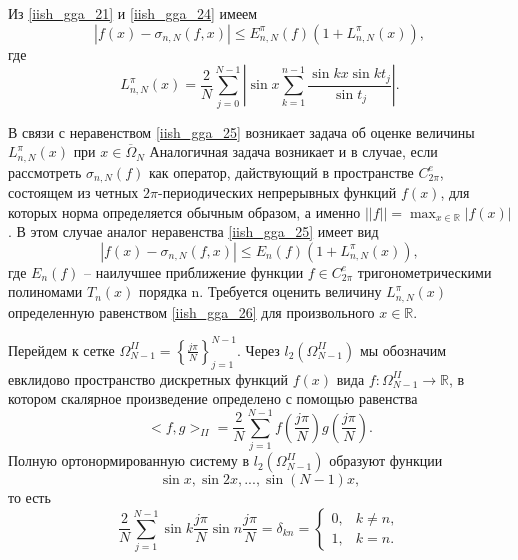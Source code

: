 Из \eqref{iish_gga_21} и \eqref{iish_gga_24} имеем
\begin{equation}
  | f(x) - \sigma_{n,N}(f,x)| \leq E_{n,N}^\pi(f) (1 + L_{n,N}^\pi(x)), \label{iish_gga_25}
\end{equation}
где
\begin{equation}
  L_{n,N}^\pi(x) = \frac2N \sum\limits_{j=0}^{N-1} \left| \sin x \sum\limits_{k=1}^{n-1} \frac{\sin kx \sin kt_j}{\sin t_j} \right|. \label{iish_gga_26}
\end{equation}

В связи с неравенством \eqref{iish_gga_25} возникает задача об оценке величины $L_{n,N}^\pi(x)$ при
$x \in \overline{\Omega}_N$
Аналогичная задача возникает и в случае, если рассмотреть $\sigma_{n,N}(f)$ как оператор, дайствующий в пространстве $C_{2\pi}^e$,
состоящем из четных $2\pi$-периодических непрерывных функций $f(x)$, для которых норма определяется
обычным образом, а именно $||f|| = \max_{x \in \mathbb{R}} |f(x)|$. В этом случае аналог неравенства \eqref{iish_gga_25} имеет вид
\begin{equation}
  |f(x) - \sigma_{n,N}(f,x)| \leq E_n(f)(1 + L_{n,N}^\pi(x)), \label{iish_gga_27}
\end{equation}
где $E_n(f)$ -- наилучшее приближение функции $f \in C_{2\pi}^e$ тригонометрическими полиномами $T_n(x)$ порядка n. Требуется
оценить величину $L_{n,N}^\pi(x)$ определенную равенством \eqref{iish_gga_26} для произвольного $x \in \mathbb{R}$.

Перейдем к сетке $\Omega_{N-1}^{II} = {\left\{ \frac{j\pi}{N} \right\}}_{j=1}^{N-1}$. Через $l_2(\Omega_{N-1}^{II})$ мы обозначим
евклидово пространство дискретных функций $f(x)$ вида $f : \Omega_{N-1}^{II} \rightarrow \mathbb{R}$, в котором скалярное произведение
определено с помощью равенства
\begin{equation}
  <f,g>_{II} = \frac2N \sum\limits_{j=1}^{N-1} f(\frac{j\pi}{N}) g(\frac{j\pi}{N}). \label{iish_gga_28}
\end{equation}
Полную ортонормированную систему в $l_2(\Omega_{N-1}^{II})$ образуют функции
\begin{equation*}
  \sin x, \sin 2x, ..., \sin (N-1)x,
\end{equation*}
то есть
\begin{equation}
  \frac2N \sum\limits_{j=1}^{N-1} \sin k\frac{j\pi}{N} \sin n \frac{j\pi}{N} = \delta_{kn} =
  \begin{cases} 0, & k \neq n, \\ 1, & k = n.\end{cases}  \label{iish_gga_29}
\end{equation}

